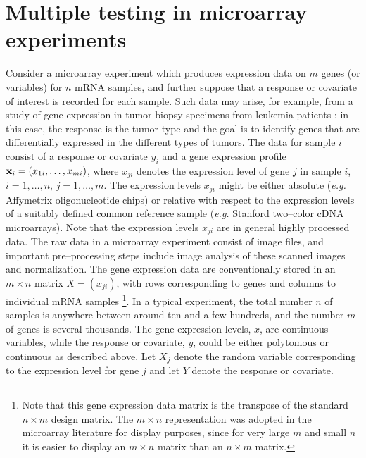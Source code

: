\documentclass[11pt]{article}
\begin{document}
\section{Multiple testing in microarray experiments}

Consider a microarray experiment which produces expression data on $m$
genes (or variables) for $n$ mRNA samples, and further suppose that a response or covariate of interest is recorded for each sample. Such data may arise, for example, from a study of gene expression in tumor biopsy specimens from leukemia patients \citep{Golubetal}: in this case, the response is the tumor type and the goal is to identify genes that are differentially expressed in the different types of tumors. The data for sample $i$ consist of a response or covariate $y_i$ and a gene expression profile ${\bf x}_i = (x_{1i}, \ldots, x_{mi})$, where $x_{ji}$ denotes the expression level of gene $j$ in sample $i$, $i=1, \ldots, n$, $j=1, \ldots, m$. The expression levels $x_{ji}$ might be either absolute ({\it e.g.} Affymetrix oligonucleotide chips) or relative with
respect to the expression levels of a suitably defined common reference sample
({\it e.g.} Stanford two--color cDNA microarrays). Note that the expression levels $x_{ji}$ are in general highly processed data. The raw data in a microarray experiment consist of image files, and important pre--processing steps include image analysis of these scanned images and normalization. The gene expression data are conventionally stored in an $m \times n$ matrix $X = (x_{ji})$, with rows corresponding to genes and columns to individual mRNA samples \footnote{Note that this gene expression data matrix is the transpose of the standard $n \times m$ design matrix. The $m \times n$ representation was adopted in the microarray literature for display purposes, since for very large $m$ and small $n$ it is easier to display an $m \times n$ matrix than an $n \times m$ matrix.}. In a typical experiment, the total number $n$ of samples is anywhere between around ten and a few hundreds, and the number $m$ of genes is several thousands. The gene expression levels, $x$, are continuous variables, while the response or covariate, $y$, could be either polytomous or continuous as described above. Let $X_j$ denote the random variable corresponding to the expression level for gene $j$ and let $Y$ denote the response or covariate.  \\
\end{document}

